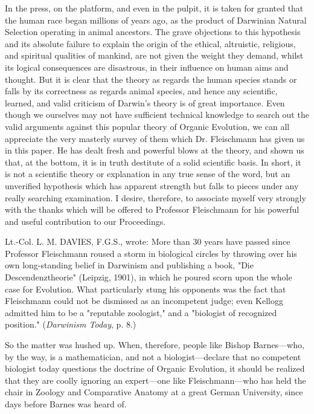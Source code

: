 In the press, on the platform, and even in the pulpit, it is taken for granted that the human
race began millions of years ago, as the product of Darwinian Natural Selection operating in
animal ancestors. The grave objections to this hypothesis and its absolute failure to explain
the origin of the ethical, altruistic, religious, and spiritual qualities of mankind, are not given
the weight they demand, whilst its logical consequences are disastrous, in their influence on
human aims and thought. But it is clear that the theory as regards the human species stands or
falls by its correctness as regards animal species, and hence any scientific, learned, and valid
criticism of Darwin's theory is of great importance. Even though we ourselves may not have
sufficient technical knowledge to search out the valid arguments against this popular theory
of Organic Evolution, we can all appreciate the very masterly survey of them which Dr.
Fleischmann has given us in this paper. He has dealt fresh and powerful blows at the theory,
and shown us that, at the bottom, it is in truth destitute of a solid scientific basis. In short, it is
not a scientific theory or explanation in any true sense of the word, but an unverified
hypothesis which has apparent strength but falls to pieces under any really searching
examination. I desire, therefore, to associate myself very strongly with the thanks which will
be offered to Professor Fleischmann for his powerful and useful contribution to our
Proceedings.

Lt.-Col. L. M. DAVIES, F.G.S., wrote: More than 30 years have passed since Professor
Fleischmann roused a storm in biological circles by throwing over his own long-standing
belief in Darwinism and publishing a book, "Die Descendenztheorie" (Leipzig, 1901), in
which he poured scorn upon the whole case for Evolution. What particularly stung his
opponents was the fact that Fleischmann could not be dismissed as an incompetent judge;
even Kellogg admitted him to be a "reputable zoologist," and a "biologist of recognized
position." (\textit{Darwinism Today}, p. 8.)

So the matter was hushed up. When, therefore, people like Bishop Barnes—who, by the way,
is a mathematician, and not a biologist—declare that no competent biologist today questions
the doctrine of Organic Evolution, it should be realized that they are coolly ignoring an
expert—one like Fleischmann—who has held the chair in Zoology and Comparative
Anatomy at a great German University, since days before Barnes was heard of.

